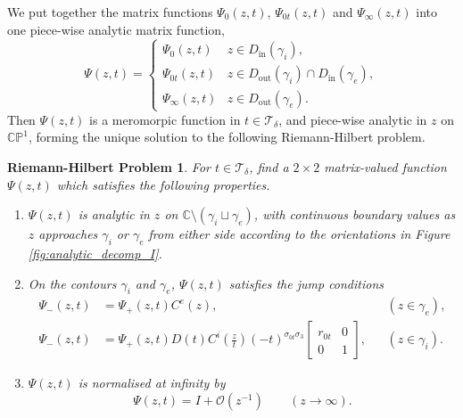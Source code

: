 \documentclass[a4paper,reqno,11pt]{amsart}
\numberwithin{equation}{section}
\numberwithin{figure}{section}
\theoremstyle{plain}
\newtheorem{rhprob}{Riemann-Hilbert Problem}
\theoremstyle{remark}
\newcounter{rhp}
\numberwithin{rhp}{section}
\begin{document}
We put together the matrix functions $\Psi_0(z,t)$, $\Psi_{0t}(z,t)$ and $\Psi_\infty(z,t)$ into one piece-wise analytic matrix function,
\begin{equation*}
    \Psi(z,t)=\begin{cases}
        \Psi_0(z,t) & z\in D_{\text{in}}(\gamma_i),\\
        \Psi_{0t}(z,t) & z\in D_{\text{out}}(\gamma_i)\cap D_{\text{in}}(\gamma_e),\\
        \Psi_\infty(z,t) & z\in D_{\text{out}}(\gamma_e).
    \end{cases}
\end{equation*}
Then $\Psi(z,t)$ is a meromorpic function in $t\in \mathcal{T}_\delta$, and piece-wise analytic in $z$ on $\mathbb{CP}^1$, forming the unique solution to the following Riemann-Hilbert problem.


\begin{rhprob}\label{rhp:factorised} For $t\in \mathcal{T}_\delta$,
find a $2\times 2$ matrix-valued function $\Psi(z,t)$ which satisfies the following properties.
  \begin{enumerate}[label={{\rm (\roman *)}}]
  \item $\Psi(z,t)$ is analytic in $z$ on $\mathbb{C}\setminus (\gamma_i\sqcup \gamma_e)$, with continuous boundary values as $z$ approaches $\gamma_i$ or $\gamma_e$ from either side according to the orientations in Figure \ref{fig:analytic_decomp_I}.
    \item On the contours $\gamma_i$ and $\gamma_e$, $\Psi(z,t)$ satisfies the jump conditions
\begin{equation}\label{eq:jumprhp}
  \begin{aligned}
    \Psi_-(z,t)&=\Psi_+(z,t)C^e(z), & &(z\in \gamma_e),\\
    \Psi_-(z,t)&=\Psi_+(z,t)D(t)C^i\left(\frac{z}{t}\right)(-t)^{\sigma_{0t} \sigma_3} \begin{bmatrix}r_{0t} & 0\\
    0 & 1\end{bmatrix}, & &(z\in \gamma_i).
\end{aligned}  
\end{equation}
 \item $\Psi(z,t)$ is normalised at infinity by
              \begin{equation*}
		\Psi(z,t)=I+\mathcal{O}(z^{-1})\qquad (z\rightarrow \infty).
              \end{equation*}
    \end{enumerate}
\end{rhprob}
\end{document}

